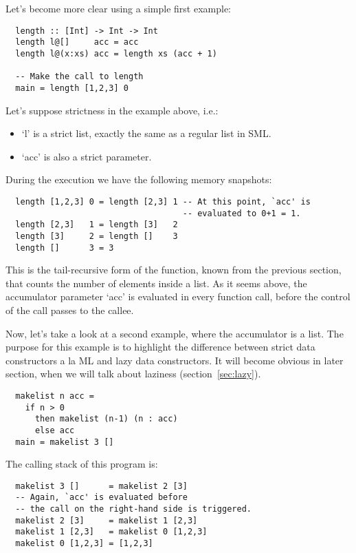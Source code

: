 \documentclass[diploma]{softlab-thesis}
\begin{document}
Let's become more clear using a simple first example:
\begin{verbatim}
  length :: [Int] -> Int -> Int
  length l@[]     acc = acc 
  length l@(x:xs) acc = length xs (acc + 1)

  -- Make the call to length
  main = length [1,2,3] 0
\end{verbatim}

Let's suppose strictness in the example above, i.e.:
\begin{itemize}
  \item `l' is a strict list, exactly the same as a regular list in SML.
  \item  `acc' is also a strict parameter. 
\end{itemize}

During the execution we have the following memory snapshots:
\begin{verbatim}
  length [1,2,3] 0 = length [2,3] 1 -- At this point, `acc' is 
                                    -- evaluated to 0+1 = 1.
  length [2,3]   1 = length [3]   2
  length [3]     2 = length []    3
  length []      3 = 3
\end{verbatim}

This is the tail-recursive form of the function, known from the previous section, that counts the number 
of elements inside a list. As it seems above, the accumulator parameter `acc' is evaluated in every 
function call, before the control of the call passes to the callee.
\newline
\par Now, let's take a look at a second example, where the accumulator is a list. The purpose for this 
example is to highlight the difference between strict data constructors a la ML and lazy data constructors.
It will become obvious in later section, when we will talk about laziness (section~\ref{sec:lazy}).

\begin{verbatim}
  makelist n acc = 
    if n > 0 
      then makelist (n-1) (n : acc)
      else acc
  main = makelist 3 []
\end{verbatim}

The calling stack of this program is:
\begin{verbatim}
  makelist 3 []      = makelist 2 [3] 
  -- Again, `acc' is evaluated before 
  -- the call on the right-hand side is triggered.
  makelist 2 [3]     = makelist 1 [2,3]
  makelist 1 [2,3]   = makelist 0 [1,2,3]
  makelist 0 [1,2,3] = [1,2,3]
\end{verbatim}
\end{document}
